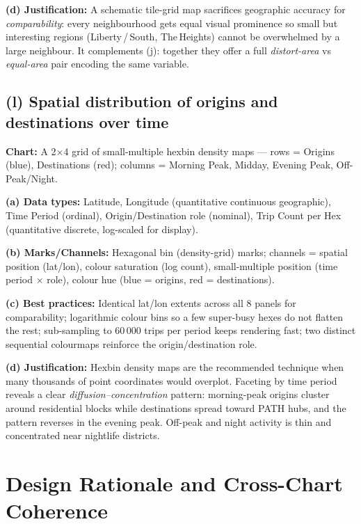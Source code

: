 \documentclass[11pt, a4paper]{article}
\begin{document}
\textbf{(d) Justification:} A schematic tile-grid map sacrifices geographic accuracy for \emph{comparability}: every neighbourhood gets equal visual prominence so small but interesting regions (Liberty\,/\,South, The\,Heights) cannot be overwhelmed by a large neighbour. It complements (j): together they offer a full \emph{distort-area} vs \emph{equal-area} pair encoding the same variable.

\subsection{(l) Spatial distribution of origins and destinations over time}
\textbf{Chart:} A 2$\times$4 grid of small-multiple hexbin density maps --- rows = Origins (blue), Destinations (red); columns = Morning Peak, Midday, Evening Peak, Off-Peak/Night.

\textbf{(a) Data types:} Latitude, Longitude (quantitative continuous geographic), Time Period (ordinal), Origin/Destination role (nominal), Trip Count per Hex (quantitative discrete, log-scaled for display).

\textbf{(b) Marks/Channels:} Hexagonal bin (density-grid) marks; channels = spatial position (lat/lon), colour saturation (log count), small-multiple position (time period $\times$ role), colour hue (blue = origins, red = destinations).

\textbf{(c) Best practices:} Identical lat/lon extents across all 8 panels for comparability; logarithmic colour bins so a few super-busy hexes do not flatten the rest; sub-sampling to 60\,000 trips per period keeps rendering fast; two distinct sequential colourmaps reinforce the origin/destination role.

\textbf{(d) Justification:} Hexbin density maps are the recommended technique when many thousands of point coordinates would overplot. Faceting by time period reveals a clear \emph{diffusion--concentration} pattern: morning-peak origins cluster around residential blocks while destinations spread toward PATH hubs, and the pattern reverses in the evening peak. Off-peak and night activity is thin and concentrated near nightlife districts.


\section{Design Rationale and Cross-Chart Coherence}
\end{document}

